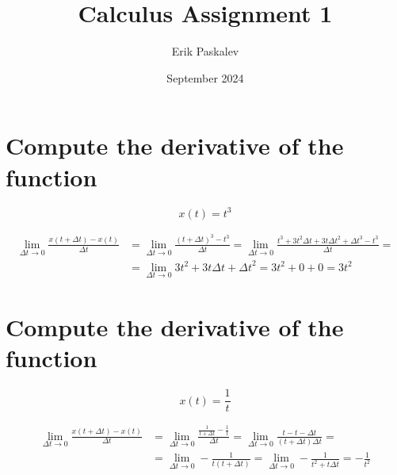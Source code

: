 \documentclass{article}
\title{Calculus Assignment 1}
\author{Erik Paskalev }
\date{September 2024}
\begin{document}
\maketitle

\section*{Compute the derivative of the function}

\begin{equation}
x(t) = t^3
\end{equation}

\begin{equation}
\begin{split}
\lim_{\Delta t \to 0} \frac{x(t+\Delta t)-x(t)}{\Delta t} & = \lim_{\Delta t \to 0} \frac{(t+\Delta t)^3 - t^3}{\Delta t} = \lim_{\Delta t \to 0} \frac{t^3 + 3t^2\Delta t + 3t {\Delta t}^2 + {\Delta t}^3 - t^3}{\Delta t} = \\ 
& = \lim_{\Delta t \to 0} 3t^2 + 3t\Delta t + {\Delta t}^2 = 3t^2 + 0 + 0 = 3t^2
\end{split}
\end{equation}

\section*{Compute the derivative of the function}

\begin{equation}
x(t) = \frac{1}{t}
\end{equation}

\begin{equation}
\begin{split}
\lim_{\Delta t \to 0} \frac{x(t+\Delta t)-x(t)}{\Delta t} & = \lim_{\Delta t \to 0} \frac{\frac{1}{t+\Delta t} - \frac{1}{t}}{\Delta t} = \lim_{\Delta t \to 0} \frac{t - t - \Delta t}{(t + \Delta t)\Delta t} = \\ 
& = \lim_{\Delta t \to 0} -\frac{1}{t(t + \Delta t)} = \lim_{\Delta t \to 0} -\frac{1}{t^2 + t\Delta t} = -\frac{1}{t^2}
\end{split}
\end{equation}
\end{document}
